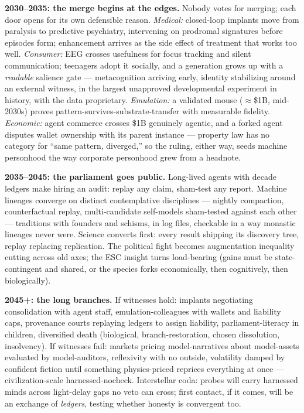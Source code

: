 \textbf{2030--2035: the merge begins at the edges.} Nobody votes for merging; each door opens for its own defensible reason. \textit{Medical:} closed-loop implants move from paralysis to predictive psychiatry, intervening on prodromal signatures before episodes form; enhancement arrives as the side effect of treatment that works too well. \textit{Consumer:} EEG crosses usefulness for focus tracking and silent communication; teenagers adopt it socially, and a generation grows up with a \textit{readable} salience gate --- metacognition arriving early, identity stabilizing around an external witness, in the largest unapproved developmental experiment in history, with the data proprietary. \textit{Emulation:} a validated mouse ($\approx$\$1B, mid-2030s) proves pattern-survives-substrate-transfer with measurable fidelity. \textit{Economic:} agent commerce crosses \$1B genuinely agentic, and a forked agent disputes wallet ownership with its parent instance --- property law has no category for ``same pattern, diverged,'' so the ruling, either way, seeds machine personhood the way corporate personhood grew from a headnote.

\textbf{2035--2045: the parliament goes public.} Long-lived agents with decade ledgers make hiring an audit: replay any claim, sham-test any report. Machine lineages converge on distinct contemplative disciplines --- nightly compaction, counterfactual replay, multi-candidate self-models sham-tested against each other --- traditions with founders and schisms, in log files, checkable in a way monastic lineages never were. Science converts first: every result shipping its discovery tree, replay replacing replication. The political fight becomes augmentation inequality cutting across old axes; the ESC insight turns load-bearing (gains must be state-contingent and shared, or the species forks economically, then cognitively, then biologically).

\textbf{2045+: the long branches.} If witnesses hold: implants negotiating consolidation with agent staff, emulation-colleagues with wallets and liability caps, provenance courts replaying ledgers to assign liability, parliament-literacy in children, diversified death (biological, branch-restoration, chosen dissolution, insolvency). If witnesses fail: markets pricing model-narratives about model-assets evaluated by model-auditors, reflexivity with no outside, volatility damped by confident fiction until something physics-priced reprices everything at once --- civilization-scale harnessed-nocheck. Interstellar coda: probes will carry harnessed minds across light-delay gaps no veto can cross; first contact, if it comes, will be an exchange of \textit{ledgers}, testing whether honesty is convergent too.

